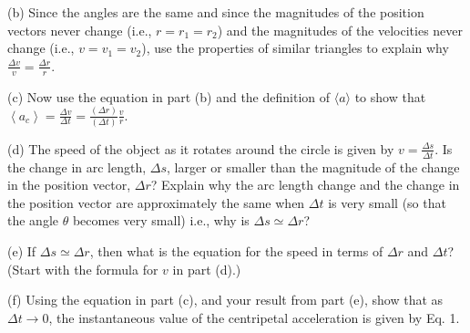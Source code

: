(b) Since the angles are the same and since the magnitudes of the position vectors 
never change (i.e., $r= r_{1}  = r_{2} $) and the magnitudes of the
velocities never change (i.e., $v = v_{1} = v_{2} $), use the properties
of similar triangles to explain why \( \frac{\Delta v}{v}=\frac{\Delta r}{r} \).
\vspace{20mm}

(c) Now use the equation in part (b) and the definition of $\langle
a\rangle$ to show that
\( \left\langle a_{c}\right\rangle =\frac{\Delta v}{\Delta t}=\frac{\left( \Delta r\right) }{\left( \Delta t\right) }\frac{v}{r}. \)
\vspace{20mm}

(d) The speed of the object as it rotates around the circle is 
given by \( v=\frac{\Delta s}{\Delta t} \).
Is the change in arc length, \( \Delta  s\), larger or smaller than the magnitude
of the change in the position vector, \( \Delta  r\)? Explain why the arc length
change and the change in the position vector are approximately the same when
$\Delta t$ is very small (so that the angle $\theta$ 
becomes very small) i.e., why is \( \Delta  s
\simeq  \Delta  r\)?
\vspace{20mm}

(e) If \( \Delta  s  \simeq   \Delta  r\), then what is the equation
for the speed in terms of \( \Delta  r\) and \( \Delta  t\)?  (Start with the formula for $v$ 
in part (d).)
\vspace{20mm}

(f) Using the equation in part (c), and your result from part (e), 
show that as \( \Delta  t\rightarrow 0 \), 
the instantaneous value of the centripetal acceleration is given by Eq. 1.

